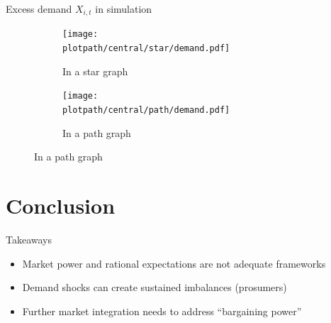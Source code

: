 \documentclass{beamer}
\newcommand{\plotpath}{../../plots}
\begin{document}
\begin{frame} {Excess demand $X_{i, t}$ in simulation}
    \begin{center}
        \begin{figure}[H]
            \begin{subfigure}{0.475\textwidth}
                \centering
                \texttt{[image: \\plotpath/central/star/demand.pdf]}
                \caption{In a star graph} \label{fig:demandshock_star}
            \end{subfigure} \hfill
            \begin{subfigure}{0.475\textwidth}
                \centering
                \texttt{[image: \\plotpath/central/path/demand.pdf]}
                \caption{In a path graph} \label{fig:demandshock_path}
            \end{subfigure}
        \end{figure}
    \end{center}
\end{frame}

\section{Conclusion}

\begin{frame}{Takeaways}
    \begin{itemize} \setlength\itemsep{1.5em}
        \item Market power and rational expectations are not adequate frameworks \pause
        \item Demand shocks can create sustained imbalances (prosumers) \pause
        \item Further market integration needs to address ``bargaining power''
    \end{itemize}
\end{frame}
\end{document}
